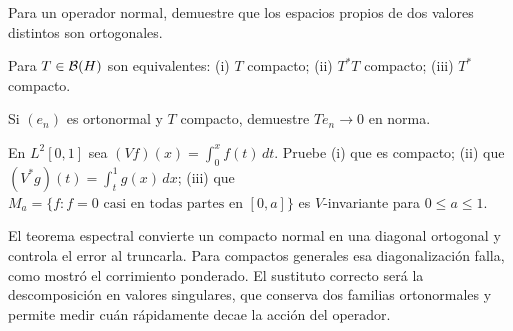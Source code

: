 \begin{ejercicio}\label{ej:v3-l11-2}
Para un operador normal, demuestre que los espacios propios de dos valores distintos son ortogonales.
\end{ejercicio}


\begin{ejercicio}\label{ej:v3-l11-3}
Para $T\in\mathcal B(H)$ son equivalentes: (i) $T$ compacto; (ii) $T^*T$ compacto; (iii) $T^*$ compacto.
\end{ejercicio}


\begin{ejercicio}\label{ej:v3-l11-4}
Si $(e_n)$ es ortonormal y $T$ compacto, demuestre $Te_n\to0$ en norma.
\end{ejercicio}


\begin{ejercicio}[Volterra]\label{ej:v3-l11-5}
En $L^2[0,1]$ sea $(Vf)(x)=\int_0^xf(t)\,dt$. Pruebe (i) que es compacto; (ii) que $(V^*g)(t)=\int_t^1g(x)\,dx$; (iii) que $M_a=\{f:f=0\text{ casi en todas partes en }[0,a]\}$ es $V$-invariante para $0\le a\le1$.
\end{ejercicio}


El teorema espectral convierte un compacto normal en una diagonal ortogonal y controla el error al truncarla. Para compactos generales esa diagonalización falla, como mostró el corrimiento ponderado. El sustituto correcto será la descomposición en valores singulares, que conserva dos familias ortonormales y permite medir cuán rápidamente decae la acción del operador.
